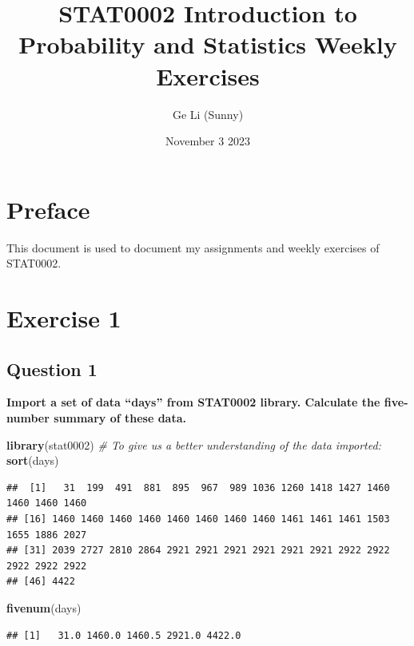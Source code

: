 \documentclass[
]{book}
\title{STAT0002 Introduction to Probability and Statistics Weekly Exercises}
\author{Ge Li (Sunny)}
\date{November 3 2023}
\newenvironment{Shaded}{\begin{snugshade}}{\end{snugshade}}
\newcommand{\CommentTok}[1]{\textcolor[rgb]{0.56,0.35,0.01}{\textit{#1}}}
\newcommand{\FunctionTok}[1]{\textcolor[rgb]{0.13,0.29,0.53}{\textbf{#1}}}
\newcommand{\NormalTok}[1]{#1}
\begin{document}
\maketitle

{
\setcounter{tocdepth}{1}
\tableofcontents
}
\chapter*{Preface}\label{preface}

This document is used to document my assignments and weekly exercises of STAT0002.

\chapter{Exercise 1}\label{exercise-1}

\section{Question 1}\label{question-1}

\textbf{Import a set of data ``days'' from STAT0002 library. Calculate the five-number summary of these data.}

\begin{Shaded}
\begin{Highlighting}[]
\FunctionTok{library}\NormalTok{(stat0002)}
\CommentTok{\# To give us a better understanding of the data imported:}
\FunctionTok{sort}\NormalTok{(days)}
\end{Highlighting}
\end{Shaded}

\begin{verbatim}
##  [1]   31  199  491  881  895  967  989 1036 1260 1418 1427 1460 1460 1460 1460
## [16] 1460 1460 1460 1460 1460 1460 1460 1460 1461 1461 1461 1503 1655 1886 2027
## [31] 2039 2727 2810 2864 2921 2921 2921 2921 2921 2921 2922 2922 2922 2922 2922
## [46] 4422
\end{verbatim}

\begin{Shaded}
\begin{Highlighting}[]
\FunctionTok{fivenum}\NormalTok{(days)}
\end{Highlighting}
\end{Shaded}

\begin{verbatim}
## [1]   31.0 1460.0 1460.5 2921.0 4422.0
\end{verbatim}
\end{document}
